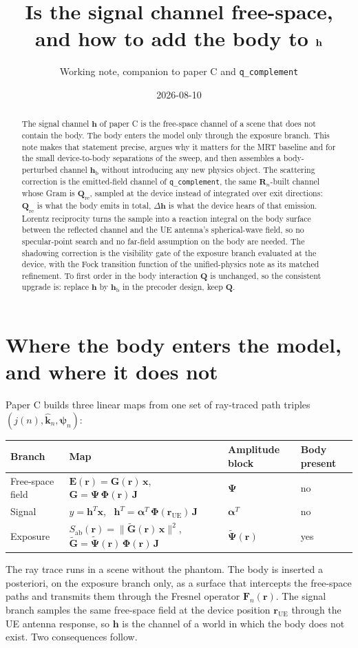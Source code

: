 \documentclass[11pt]{article}
\title{Is the signal channel free-space, and how to add the body to $\hh$}
\author{Working note, companion to paper C and \texttt{q\_complement}}
\date{2026-08-10}
\newcommand{\khat}{\hat{\bm{k}}}
\newcommand{\rr}{\mathbf{r}}
\newcommand{\xx}{\mathbf{x}}
\newcommand{\hh}{\mathbf{h}}
\newcommand{\GG}{\mathbf{G}}
\newcommand{\Gtil}{\tilde{\mathbf{G}}}
\newcommand{\Qmat}{\mathbf{Q}}
\newcommand{\Qref}{\mathbf{Q}_{\mathrm{re}}}
\newcommand{\Jmat}{\mathbf{J}}
\newcommand{\Phimat}{\mathbf{\Phi}}
\newcommand{\Psimat}{\bm{\Psi}}
\newcommand{\Fn}{\mathbf{F}_n}
\newcommand{\Rn}{\mathbf{R}_n}
\newcommand{\psin}{\bm{\psi}_n}
\newcommand{\rue}{\rr_{\mathrm{UE}}}
\newcommand{\hb}{\hh_{\mathrm{b}}}
\theoremstyle{remark}
\begin{document}
\maketitle

\begin{abstract}
\noindent
The signal channel $\hh$ of paper C is the free-space channel of a
scene that does not contain the body. The body enters the model only
through the exposure branch. This note makes that statement precise,
argues why it matters for the MRT baseline and for the small
device-to-body separations of the sweep, and then assembles a
body-perturbed channel $\hb$ without introducing any new physics
object. The scattering correction is the emitted-field channel of
\texttt{q\_complement}, the same $\Rn$-built channel whose Gram is
$\Qref$, sampled at the device instead of integrated over exit
directions: $\Qref$ is what the body emits in total, $\Delta\hh$ is
what the device hears of that emission. Lorentz reciprocity turns the
sample into a reaction integral on the body surface between the
reflected channel and the UE antenna's spherical-wave field, so no
specular-point search and no far-field assumption on the body are
needed. The shadowing correction is the visibility gate of the
exposure branch evaluated at the device, with the Fock transition
function of the unified-physics note as its matched refinement. To
first order in the body interaction $\Qmat$ is unchanged, so the
consistent upgrade is: replace $\hh$ by $\hb$ in the precoder design,
keep $\Qmat$.
\end{abstract}

\section{Where the body enters the model, and where it does not}

Paper C builds three linear maps from one set of ray-traced path
triples $(j(n), \khat_n, \psin)$:
\begin{center}
\begin{tabular}{@{}llll@{}}
\toprule
Branch & Map & Amplitude block & Body present \\
\midrule
Free-space field & $\mathbf{E}(\rr) = \GG(\rr)\,\xx$,
  \ $\GG = \Psimat\,\Phimat(\rr)\,\Jmat$ & $\Psimat$ & no \\
Signal & $y = \hh^T \xx$,
  \ $\hh^T = \bm{\alpha}^T\,\Phimat(\rue)\,\Jmat$ & $\bm{\alpha}^T$ & no \\
Exposure & $S_{\mathrm{ab}}(\rr) = \|\Gtil(\rr)\,\xx\|^2$,
  \ $\Gtil = \tilde{\bm{\Psi}}(\rr)\,\Phimat(\rr)\,\Jmat$ & $\tilde{\bm{\Psi}}(\rr)$ & yes \\
\bottomrule
\end{tabular}
\end{center}
The ray trace runs in a scene without the phantom. The body is
inserted a posteriori, on the exposure branch only, as a surface that
intercepts the free-space paths and transmits them through the Fresnel
operator $\Fn(\rr)$. The signal branch samples the same free-space
field at the device position $\rue$ through the UE antenna response,
so $\hh$ is the channel of a world in which the body does not exist.
Two consequences follow.
\end{document}
